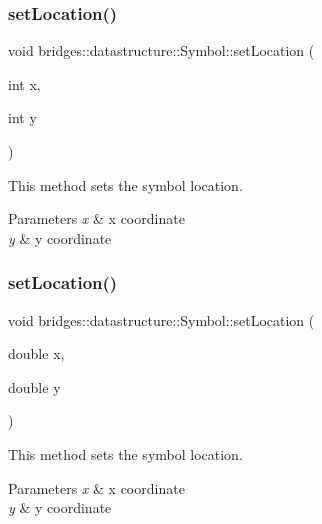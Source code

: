 \subsubsection{\texorpdfstring{set\+Location()}{setLocation()}\hspace{0.1cm}{\footnotesize\ttfamily [1/3]}}
{\footnotesize\ttfamily void bridges\+::datastructure\+::\+Symbol\+::set\+Location (\begin{DoxyParamCaption}\item[{int}]{x,  }\item[{int}]{y }\end{DoxyParamCaption})\hspace{0.3cm}{\ttfamily [inline]}}



This method sets the symbol location. 


\begin{DoxyParams}{Parameters}
{\em x} & x coordinate \\
\hline
{\em y} & y coordinate \\
\hline
\end{DoxyParams}
\mbox{\label{classbridges_1_1datastructure_1_1_symbol_af76b495d18afdee5d1a6551eceba583b}} 
\subsubsection{\texorpdfstring{set\+Location()}{setLocation()}\hspace{0.1cm}{\footnotesize\ttfamily [2/3]}}
{\footnotesize\ttfamily void bridges\+::datastructure\+::\+Symbol\+::set\+Location (\begin{DoxyParamCaption}\item[{double}]{x,  }\item[{double}]{y }\end{DoxyParamCaption})\hspace{0.3cm}{\ttfamily [inline]}}



This method sets the symbol location. 


\begin{DoxyParams}{Parameters}
{\em x} & x coordinate \\
\hline
{\em y} & y coordinate \\
\hline
\end{DoxyParams}
\mbox{\label{classbridges_1_1datastructure_1_1_symbol_a4dbf51dac8b22b293a7061f5eb84b460}} 

